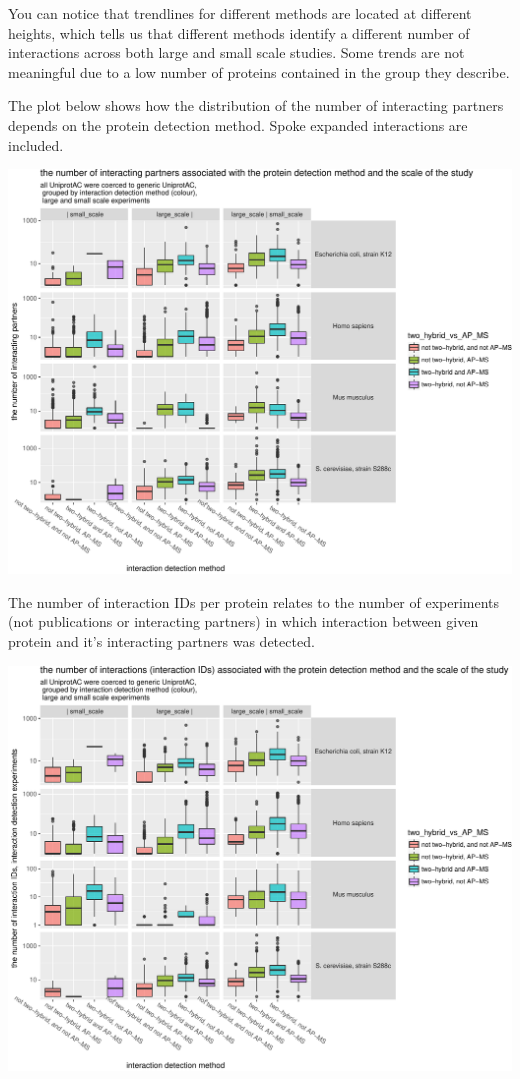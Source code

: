 \documentclass[]{article}
\begin{document}
You can notice that trendlines for different methods are located at
different heights, which tells us that different methods identify a
different number of interactions across both large and small scale
studies. Some trends are not meaningful due to a low number of proteins
contained in the group they describe.

The plot below shows how the distribution of the number of interacting
partners depends on the protein detection method. Spoke expanded
interactions are included.

\includegraphics{final_report_files/figure-latex/interaction_properties_vs_unique_interactors-1.pdf}

The number of interaction IDs per protein relates to the number of
experiments (not publications or interacting partners) in which
interaction between given protein and it's interacting partners was
detected.

\includegraphics{final_report_files/figure-latex/interaction_properties_vs_unique_interaction_IDs-1.pdf}
\end{document}
